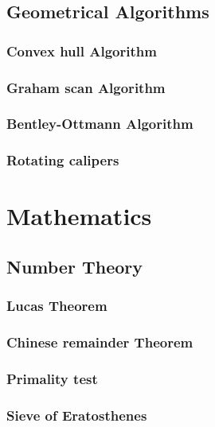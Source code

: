 \documentclass[10pt,landscape,twocolumn]{article}
\begin{document}
\subsection{Geometrical Algorithms}
\subsubsection{Convex hull Algorithm}
\subsubsection{Graham scan Algorithm}
\subsubsection{Bentley-Ottmann Algorithm}
\subsubsection{Rotating calipers}

\section{Mathematics}

\subsection{Number Theory}
\subsubsection{Lucas Theorem}
\subsubsection{Chinese remainder Theorem}
\subsubsection{Primality test}
\subsubsection{Sieve of Eratosthenes}

\end{document}
